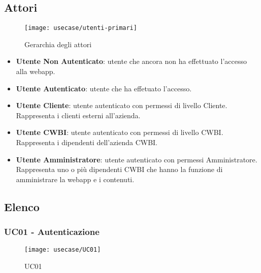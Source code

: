\subsection{Attori}


\begin{figure}[H]
    \centering 
    \texttt{[image: usecase/utenti-primari]} 
    \caption{Gerarchia degli attori}
\end{figure}

\begin{itemize}
\item \textbf{Utente Non Autenticato}: utente che ancora non ha effettuato l'accesso alla webapp. 
\item \textbf{Utente Autenticato}: utente che ha effetuato l'accesso.  
\item \textbf{Utente Cliente}: utente autenticato con permessi di livello Cliente. Rappresenta i clienti esterni all'azienda. 
\item \textbf{Utente CWBI}: utente autenticato con permessi di livello CWBI. Rappresenta i dipendenti dell'azienda CWBI. 
\item \textbf{Utente Amministratore}: utente autenticato con permessi Amministratore. Rappresenta uno o più dipendenti CWBI che hanno la funzione di amministrare la webapp e i contenuti. 
\end{itemize}



\subsection{Elenco}
\subsubsection{UC01 - Autenticazione}

\begin{figure}[H]
    \centering 
    \texttt{[image: usecase/UC01]}
    \caption{UC01}
\end{figure}

